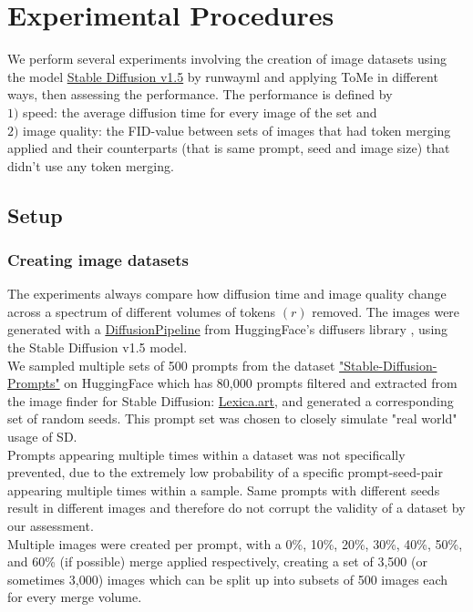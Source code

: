 \section{Experimental Procedures} \label{experiments}
We perform several experiments involving the creation of image datasets using the model \href{https://huggingface.co/runwayml/stable-diffusion-v1-5}{Stable Diffusion v1.5} by runwayml \cite{Rombach_2022_CVPR} and applying ToMe in different ways, then assessing the performance.
The performance is defined by\\ 
\(1)\) speed: the average diffusion time for every image of the set and\\
\(2)\) image quality: the FID-value between sets of images that had token merging applied and their counterparts (that is same prompt, seed and image size) that didn't use any token merging.



\subsection{Setup}
\subsubsection*{Creating image datasets}
The experiments always compare how diffusion time and image quality change across a spectrum of different volumes of tokens \((r)\) removed.
The images were generated with a \href{https://huggingface.co/docs/diffusers/v0.18.2/en/api/diffusion_pipeline}{DiffusionPipeline} from HuggingFace's diffusers library \cite{von-platen-etal-2022-diffusers}, using the Stable Diffusion v1.5 model.\\
We sampled multiple sets of 500 prompts from the dataset \href{https://huggingface.co/datasets/Gustavosta/Stable-Diffusion-Prompts}{"Stable-Diffusion-Prompts"} on HuggingFace which has 80,000 prompts filtered and extracted from the image finder for Stable Diffusion: \href{https://lexica.art}{Lexica.art}, and generated a corresponding set of random seeds. This prompt set was chosen to closely simulate "real world" usage of SD.\\
Prompts appearing multiple times within a dataset was not specifically prevented, due to the extremely low probability of a specific prompt-seed-pair appearing multiple times within a sample. Same prompts with different seeds result in different images and therefore do not corrupt the validity of a dataset by our assessment.\\
Multiple images were created per prompt, with a 0\%, 10\%, 20\%, 30\%, 40\%, 50\%, and 60\% (if possible) merge applied respectively, creating a set of 3,500 (or sometimes 3,000) images which can be split up into subsets of 500 images each for every merge volume.



